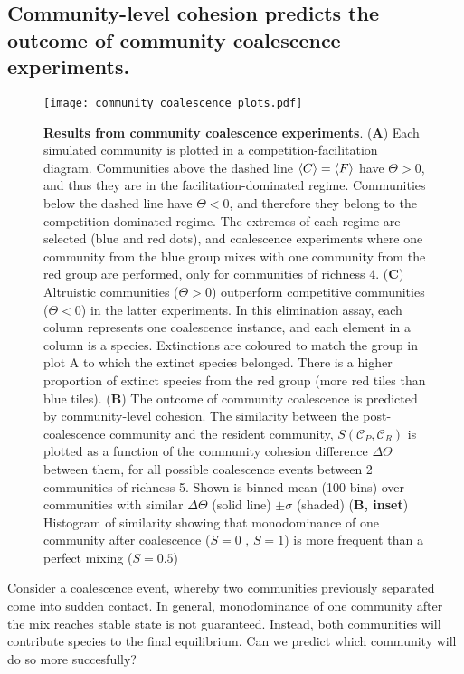\documentclass[titlepage,11pt]{article}
\begin{document}
\begin{linenumbers}
\begin{singlespace}
\subsection{Community-level cohesion predicts the outcome of community coalescence experiments.}
\begin{figure}
	\centering			
	\texttt{[image: community\_coalescence\_plots.pdf]}
	\caption{\textbf{Results from community coalescence experiments}. (\textbf{A}) Each simulated community is plotted in a competition-facilitation diagram. Communities above the dashed line $ \braket{C} = \braket{F} $ have $ \Theta > 0 $, and thus they are in the facilitation-dominated regime. Communities below the dashed line have $ \Theta <0 $, and therefore they belong to the competition-dominated regime. The extremes of each regime are selected (blue and red dots), and coalescence experiments where one community from the blue group mixes with one community from the red group are performed, only for communities of richness 4. (\textbf{C}) Altruistic communities ($ \Theta > 0 $) outperform competitive communities ($ \Theta < 0 $) in the latter experiments. In this elimination assay, each column represents one coalescence instance, and each element in a column is a species. Extinctions are coloured to match the group in plot A to which the extinct species belonged. There is a higher proportion of extinct species from the red group (more red tiles than blue tiles). (\textbf{B}) The outcome of community coalescence is predicted by community-level cohesion.  The similarity between the post-coalescence community and the resident community, $ S (\mathcal{C}_P, \mathcal{C}_R) $ is plotted as a function of the community cohesion difference $ \Delta \Theta $ between them, for all possible coalescence events between 2 communities of richness 5. Shown is binned mean (100 bins) over communities with similar $ \Delta \Theta $ (solid line) $ \pm \sigma $ (shaded) (\textbf{B, inset}) Histogram of similarity showing that monodominance of one community after coalescence  ($ S = 0 \text{ , } S = 1 $) is more frequent than a perfect mixing ($ S = 0.5 $) }
	\label{fig:community_coalescence_results}
\end{figure}
Consider a coalescence event, whereby two communities previously separated come into sudden contact. In general, monodominance of one community after the mix reaches stable state is not guaranteed. Instead, both communities will contribute species to the final equilibrium. Can we predict which community will do so more succesfully?\\

\end{singlespace}
\end{linenumbers}
\end{document}
